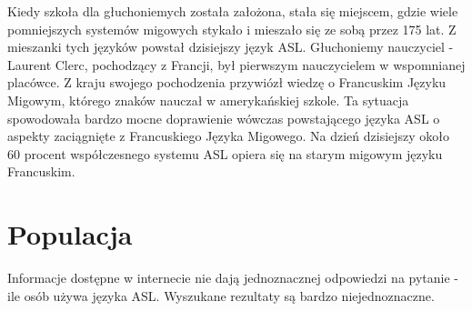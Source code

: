 \documentclass[a4paper,12pt,oneside]{book} %
\begin{document}
Kiedy szkoła dla głuchoniemych została założona, stała się miejscem, gdzie wiele pomniejszych systemów migowych stykało i mieszało się ze sobą przez 175 lat. Z mieszanki tych języków powstał dzisiejszy język ASL. Głuchoniemy nauczyciel - Laurent Clerc, pochodzący z Francji, był pierwszym nauczycielem w wspomnianej placówce. Z kraju swojego pochodzenia przywiózł wiedzę o Francuskim Języku Migowym, którego znaków nauczał w amerykańskiej szkole. Ta sytuacja spowodowała bardzo mocne doprawienie wówczas powstającego języka ASL o aspekty zaciągnięte z Francuskiego Języka Migowego. Na dzień dzisiejszy około 60 procent współczesnego systemu ASL opiera się na starym migowym języku Francuskim.\cite{bahan}


\section{Populacja}
Informacje dostępne w internecie nie dają jednoznacznej odpowiedzi na pytanie - ile osób używa języka ASL. Wyszukane rezultaty są bardzo niejednoznaczne\cite{population}.
\end{document}
